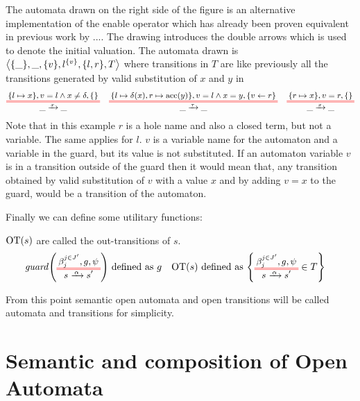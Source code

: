 \documentclass{article}
\begin{document}
\begin{exi}
The automata drawn on the right side of the figure is an alternative implementation of the enable operator which has already been proven equivalent in previous work by ....
The drawing introduces the double arrows which is used to denote the initial valuation.
The automata drawn is \(\left<{\left\{\_\right\}},\_,{\left\{v\right\}},l^{\left\{v\right\}},{\left\{l, r\right\}},T\right>\) where transitions in \(T\) are like previously all the transitions generated by valid substitution of \(x\) and \(y\) in
\begin{align*}
	\OT{\_}{\_}{x}{\mbrc{l \mapsto x}}{v = l \wedge x \neq \delta}{\mbrc{}} &&
	\OT{\_}{\_}{\tau}{\mbrc{l \mapsto \delta\mpar{x}, r \mapsto \act{acc}\mpar{y}}}{v = l \wedge x = y}{\mbrc{v \gets r}} &&
	\OT{\_}{\_}{x}{\mbrc{r \mapsto x}}{v = r}{\mbrc{}}
\end{align*}
Note that in this example \(r\) is a hole name and also a closed term, but not a variable.
The same applies for \(l\).
\(v\) is a variable name for the automaton and a variable in the guard, but its value is not substituted.
If an automaton variable \(v\) is in a transition outside of the guard then it would mean that, any transition obtained by valid substitution of \(v\) with a value \(x\) and by adding \(v = x\) to the guard, would be a transition of the automaton.

\end{exi}

Finally we can define some utilitary functions:
\begin{defi}
\(\mathrm{OT}{\left(s\right)}\) are called the out-transitions of \(s\).
\begin{align*}
	\fguard{\OTg} & \defnotation g &
	\fOT{s} & \defnotation \mbrc{\OTg \in T}
\end{align*}
\end{defi}
From this point semantic open automata and open transitions will be called automata and transitions for simplicity.


\section{Semantic and composition of Open Automata} %
\end{document}
